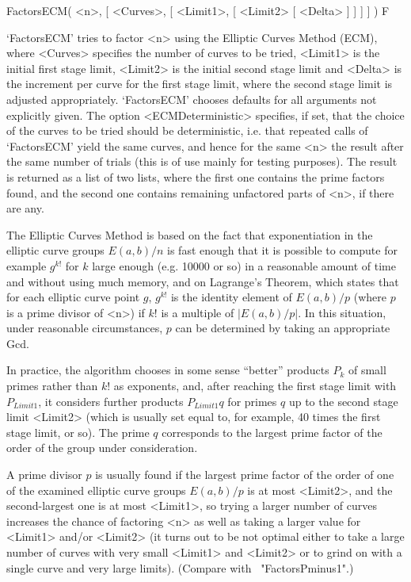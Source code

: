 \>FactorsECM( <n>, [ <Curves>, [ <Limit1>, [ <Limit2> [ <Delta> ] ] ] ] ) F

`FactorsECM' tries to factor <n> using the Elliptic Curves Method (ECM),
where <Curves> specifies the number of curves to be tried,
<Limit1> is the initial
first stage limit,
<Limit2> is the initial
second stage limit and
<Delta> is the increment per curve for the first stage limit, where
the second stage limit is adjusted appropriately. 
`FactorsECM' chooses defaults for all arguments not explicitly given.
The option <ECMDeterministic> specifies,
if set, that the choice of the curves to be tried should be 
deterministic, i.e. that repeated calls of `FactorsECM' yield 
the same curves, and hence for the same <n> the result after the same
number of trials (this is of use mainly for testing purposes).
The result is returned as a list of two lists, where the first one 
contains the prime factors found, and the second one contains
remaining unfactored parts of <n>, if there are any.

The Elliptic Curves Method is based on the fact that exponentiation
in the
elliptic curve groups 
$E(a,b)/n$ is fast enough
that it is possible to compute for example $g^{k!}$ for $k$ large enough 
(e.g. 10000 or so) in a reasonable amount of time and without
using much memory, and on Lagrange's Theorem, 
which states that for each
elliptic curve point $g$,
$g^{k!}$ is the identity element of $E(a,b)/p$ (where $p$ is a prime
divisor of <n>) if $k!$ is a multiple of $|E(a,b)/p|$.
In this situation, under reasonable circumstances, $p$ can be
determined by taking an appropriate Gcd.

In practice, the algorithm chooses in some sense ``better''
products $P_k$ of small primes rather than $k!$ as exponents, and,
after reaching the first stage limit with $P_{Limit1}$, it
considers further products $P_{Limit1}q$ for primes $q$ up to
the second stage limit <Limit2> (which is usually set equal to, 
for example, 40 times the first stage limit, or so).
The prime $q$ corresponds to the largest prime factor of the
order of the group under consideration.

A prime divisor $p$ is usually found if the largest prime factor
of the order of one of the examined elliptic curve groups $E(a,b)/p$ 
is at most <Limit2>, and the second-largest one is at most <Limit1>,
so trying a larger number of curves increases the chance of
factoring <n> as well as taking a larger value
for <Limit1> and/or <Limit2> (it turns out to be not optimal either to
take a large number of curves with very small <Limit1> and <Limit2> 
or to grind on with a single curve and very large limits).
(Compare with ~"FactorsPminus1".)

